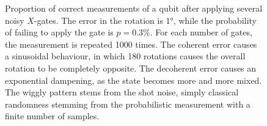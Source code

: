 \begin{figure}
    \centering
    \caption{
        Proportion of correct measurements of a qubit after applying several noisy $X$-gates.
        The error in the rotation is \ang{1}, while the probability of failing to apply the gate is $p=0.3\%$.
        For each number of gates, the measurement is repeated 1000 times.
        The coherent error causes a sinusoidal behaviour, in which 180 rotations causes the overall rotation to be completely opposite.
        The decoherent error causes an exponential dampening, as the state becomes more and more mixed.
        The wiggly pattern stems from the shot noise, simply classical randomness stemming from the probabilistic measurement with a finite number of samples.
    }
    \label{fig:noise_graph}
\end{figure}

